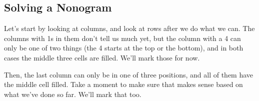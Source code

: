 \documentclass{article}
\begin{document}
\begin{center}
    \begin{nonogram}[rows=5,columns=5,scale=0.35,width=3cm,
        fontsize=footnotesize,helplines=5,extracells=2]


    \end{nonogram}
\end{center}

\subsection{Solving a Nonogram}

Let's start by looking at columns, and look at rows after we do what we can.
The columns with 1s in them don't tell us much yet, but the column with a 4 can only be one of two things (the 4 starts at the top or the bottom), and in both cases the middle three cells are filled.
We'll mark those for now.

\begin{center}
    \begin{nonogram}[rows=5,columns=5,scale=0.35,width=3cm,
        fontsize=footnotesize,helplines=5,extracells=2]
        

    \end{nonogram}
\end{center}

Then, the last column can only be in one of three positions, and all of them have the middle cell filled.
Take a moment to make sure that makes sense based on what we've done so far.
We'll mark that too.

\begin{center}
    \begin{nonogram}[rows=5,columns=5,scale=0.35,width=3cm,
        fontsize=footnotesize,helplines=5,extracells=2]


    \end{nonogram}
\end{center}
\end{document}
